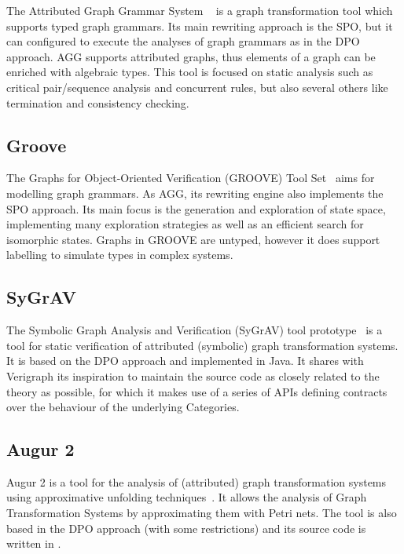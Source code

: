   The Attributed Graph Grammar System ~\cite{Taentzer2000} is a graph transformation tool which supports typed graph grammars.
  Its main rewriting approach is the SPO, but it can configured to execute the analyses of graph grammars as in the DPO approach.
  AGG supports attributed graphs, thus elements of a graph can be enriched with algebraic types.
  This tool is focused on static analysis such as critical pair/sequence analysis and concurrent rules, but also several others like termination and consistency checking.

\subsection{Groove}The Graphs for Object-Oriented Verification (GROOVE) Tool Set~\cite{Rensink2004} aims for modelling graph grammars. As AGG, its rewriting engine also implements the SPO approach. Its main focus is the generation and exploration of state space, implementing many exploration strategies as well as an efficient search for isomorphic states. Graphs in GROOVE are untyped, however it does support labelling to simulate types in complex systems.


\subsection{SyGrAV}

The Symbolic Graph Analysis and Verification (SyGrAV) tool prototype~\cite{Deckwerth2016} is a tool for static verification of attributed (symbolic) graph transformation systems. It is based on the DPO approach and implemented in Java. It shares with Verigraph its inspiration to maintain the source code as closely related to the theory as possible, for which it makes use of a series of APIs defining contracts over the behaviour of the underlying Categories.

\subsection{Augur 2}

  Augur 2 is a tool for the analysis of (attributed) graph transformation systems using approximative unfolding techniques~\cite{Konig2008}. It allows the analysis of Graph Transformation Systems by approximating them with Petri nets. The tool is also based in the DPO approach (with some restrictions) and its source code is written in . 
